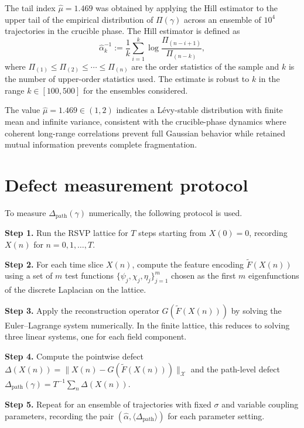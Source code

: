 \documentclass[12pt, oneside]{memoir}
\newcommand{\X}{\mathcal{X}}
\newcommand{\Ft}{\widetilde{F}}
\newcommand{\Dpth}{\Delta_{\mathrm{path}}}
\newcommand{\nnorm}[1]{\lVert #1 \rVert}
\begin{document}
The tail index $\hat\mu = 1.469$ was obtained by applying the Hill estimator to the
upper tail of the empirical distribution of $\Pi(\gamma)$ across an ensemble of $10^4$
trajectories in the crucible phase.  The Hill estimator is defined as
\begin{equation}
  \hat\alpha^{-1}_k := \frac{1}{k} \sum_{i=1}^k \log \frac{\Pi_{(n-i+1)}}{\Pi_{(n-k)}},
\end{equation}
where $\Pi_{(1)} \le \Pi_{(2)} \le \cdots \le \Pi_{(n)}$ are the order statistics of the
sample and $k$ is the number of upper-order statistics used.  The estimate is robust to
$k$ in the range $k \in [100, 500]$ for the ensembles considered.

The value $\hat\mu = 1.469 \in (1,2)$ indicates a Lévy-stable distribution with
finite mean and infinite variance, consistent with the crucible-phase dynamics where
coherent long-range correlations prevent full Gaussian behavior while retained mutual
information prevents complete fragmentation.

\section{Defect measurement protocol}

To measure $\Dpth(\gamma)$ numerically, the following protocol is used.

\medskip\noindent
\textbf{Step 1.} Run the RSVP lattice for $T$ steps starting from $X(0) = 0$, recording
$X(n)$ for $n = 0, 1, \dots, T$.

\medskip\noindent
\textbf{Step 2.} For each time slice $X(n)$, compute the feature encoding $\Ft(X(n))$
using a set of $m$ test functions $\{\psi_j, \chi_j, \eta_j\}_{j=1}^m$ chosen as the
first $m$ eigenfunctions of the discrete Laplacian on the lattice.

\medskip\noindent
\textbf{Step 3.} Apply the reconstruction operator $G(\Ft(X(n)))$ by solving the
Euler--Lagrange system  numerically.  In the finite
lattice, this reduces to solving three linear systems, one for each field component.

\medskip\noindent
\textbf{Step 4.} Compute the pointwise defect $\Delta(X(n)) = \nnorm{X(n) -
G(\Ft(X(n)))}_\X$ and the path-level defect $\Dpth(\gamma) = T^{-1} \sum_n \Delta(X(n))$.

\medskip\noindent
\textbf{Step 5.} Repeat for an ensemble of trajectories with fixed $\sigma$ and variable
coupling parameters, recording the pair $(\hat\alpha, \langle\Dpth\rangle)$ for each
parameter setting.
\end{document}
